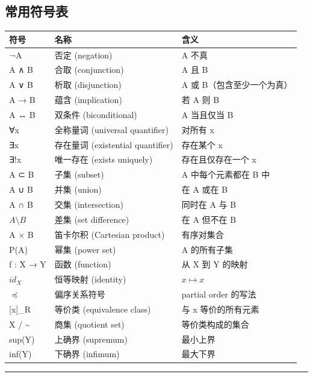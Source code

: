 \documentclass[
  11pt,
]{article}
\begin{document}
\subsection{常用符号表}\label{ux5e38ux7528ux7b26ux53f7ux8868}

\begin{longtable}[]{@{}lll@{}}
\toprule\noalign{}
符号 & 名称 & 含义 \\
\midrule\noalign{}
\endhead
\bottomrule\noalign{}
\endlastfoot
¬A & 否定 (negation) & A 不真 \\
A ∧ B & 合取 (conjunction) & A 且 B \\
A ∨ B & 析取 (disjunction) & A 或 B（包含至少一个为真） \\
A → B & 蕴含 (implication) & 若 A 则 B \\
A ↔ B & 双条件 (biconditional) & A 当且仅当 B \\
∀x & 全称量词 (universal quantifier) & 对所有 x \\
∃x & 存在量词 (existential quantifier) & 存在某个 x \\
∃!x & 唯一存在 (exists uniquely) & 存在且仅存在一个 x \\
A ⊂ B & 子集 (subset) & A 中每个元素都在 B 中 \\
A ∪ B & 并集 (union) & 在 A 或在 B \\
A ∩ B & 交集 (intersection) & 同时在 A 与 B \\
\(A\setminus B\) & 差集 (set difference) & 在 A 但不在 B \\
A × B & 笛卡尔积 (Cartesian product) & 有序对集合 \\
P(A) & 幂集 (power set) & A 的所有子集 \\
f : X → Y & 函数 (function) & 从 X 到 Y 的映射 \\
\(id_X\) & 恒等映射 (identity) & \(x \mapsto x\) \\
\(\preceq\) & 偏序关系符号 & partial order 的写法 \\
{[}x{]}\_R & 等价类 (equivalence class) & 与 x 等价的所有元素 \\
X / \textasciitilde{} & 商集 (quotient set) & 等价类构成的集合 \\
sup(Y) & 上确界 (supremum) & 最小上界 \\
inf(Y) & 下确界 (infimum) & 最大下界 \\
\end{longtable}

\begin{center}\rule{0.5\linewidth}{0.5pt}\end{center}
\end{document}
